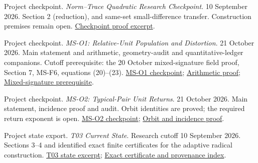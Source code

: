 Project checkpoint. \emph{Norm--Trace Quadratic Research Checkpoint}. 10 September 2026. Section 2 (reduction), and same-set small-difference transfer. Construction premises remain open. \href{https://github.com/hnt119/polynomial-image-compression/blob/145d0e5a6ff725ab13cbb5c696bf335352e6f4a1/research/report-source-supplement/norm-transfer/norm-transfer.md}{Checkpoint proof excerpt}.

Project checkpoint. \emph{MS-O1: Relative-Unit Population and Distortion}. 21 October 2026. Main statement and arithmetic, geometry-audit and quantitative-ledger companions. Cutoff prerequisite: the 20 October mixed-signature field proof, Section 7, MS-F6, equations (20)--(23). \href{https://github.com/hnt119/polynomial-image-compression/blob/145d0e5a6ff725ab13cbb5c696bf335352e6f4a1/research/notes/2026-10-21-relative-unit-population/README.md}{MS-O1 checkpoint}; \href{https://github.com/hnt119/polynomial-image-compression/blob/145d0e5a6ff725ab13cbb5c696bf335352e6f4a1/research/notes/2026-10-21-relative-unit-population/arithmetic.md}{Arithmetic proof}; \href{https://github.com/hnt119/polynomial-image-compression/blob/145d0e5a6ff725ab13cbb5c696bf335352e6f4a1/research/notes/2026-10-20-mixed-signature/field-units.md}{Mixed-signature prerequisite}.

Project checkpoint. \emph{MS-O2: Typical-Pair Unit Returns}. 21 October 2026. Main statement, incidence proof and audit. Orbit identities are proved; the required return exponent is open. \href{https://github.com/hnt119/polynomial-image-compression/blob/145d0e5a6ff725ab13cbb5c696bf335352e6f4a1/research/notes/2026-10-21-typical-unit-returns/README.md}{MS-O2 checkpoint}; \href{https://github.com/hnt119/polynomial-image-compression/blob/145d0e5a6ff725ab13cbb5c696bf335352e6f4a1/research/notes/2026-10-21-typical-unit-returns/incidences.md}{Orbit and incidence proof}.

Project state export. \emph{T03 Current State}. Research cutoff 10 September 2026. Sections 3--4 and identified exact finite certificates for the adaptive radical construction. \href{https://github.com/hnt119/polynomial-image-compression/blob/145d0e5a6ff725ab13cbb5c696bf335352e6f4a1/research/report-source-supplement/adaptive-root/state-sections-2-to-7.md}{T03 state excerpt}; \href{https://github.com/hnt119/polynomial-image-compression/blob/145d0e5a6ff725ab13cbb5c696bf335352e6f4a1/research/report-source-supplement/README.md}{Exact certificate and provenance index}.

